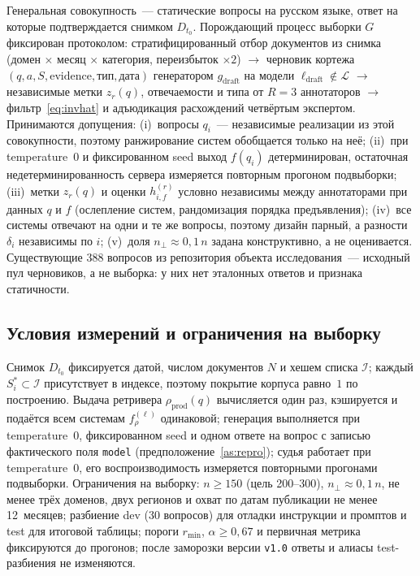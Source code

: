 \documentclass{article}
\newcommand{\Lm}{\mathcal{L}}
\newcommand{\rprod}{\rho_{\mathrm{prod}}}
\newcommand{\ldraft}{\ell_{\mathrm{draft}}}
\newcommand{\gdraft}{g_{\mathrm{draft}}}
\newcommand{\refuse}{\bot}                          %
\newcommand{\rmin}{r_{\min}}
\begin{document}
Генеральная совокупность~--- статические вопросы на русском языке, ответ на которые подтверждается снимком $D_{t_0}$. Порождающий процесс выборки $G$ фиксирован протоколом: стратифицированный отбор документов из снимка (домен $\times$ месяц $\times$ категория, переизбыток $\times2$) $\to$ черновик кортежа $(q,a,S,\text{evidence},\text{тип},\text{дата})$ генератором $\gdraft$ на модели $\ldraft\notin\Lm$ $\to$ независимые метки $z_r(q)$, отвечаемости и типа от $R=3$ аннотаторов $\to$ фильтр~\eqref{eq:invhat} и адъюдикация расхождений четвёртым экспертом. Принимаются допущения: (i)~вопросы $q_i$~--- независимые реализации из этой совокупности, поэтому ранжирование систем обобщается только на неё; (ii)~при temperature~$0$ и фиксированном seed выход $f(q_i)$ детерминирован, остаточная недетерминированность сервера измеряется повторным прогоном подвыборки; (iii)~метки $z_r(q)$ и оценки $h^{(r)}_{i,f}$ условно независимы между аннотаторами при данных $q$ и $f$ (ослепление систем, рандомизация порядка предъявления); (iv)~все системы отвечают на одни и те же вопросы, поэтому дизайн парный, а разности $\delta_i$ независимы по $i$; (v)~доля $n_{\refuse}\approx0{,}1\,n$ задана конструктивно, а не оценивается. Существующие 388 вопросов из репозитория объекта исследования~--- исходный пул черновиков, а не выборка: у них нет эталонных ответов и признака статичности.

\subsection{Условия измерений и ограничения на выборку}

Снимок $D_{t_0}$ фиксируется датой, числом документов $N$ и хешем списка $\mathcal{I}$; каждый $S^*_i\subset\mathcal{I}$ присутствует в индексе, поэтому покрытие корпуса равно~$1$ по построению. Выдача ретривера $\rprod(q)$ вычисляется один раз, кэшируется и подаётся всем системам $f_\rho^{(\ell)}$ одинаковой; генерация выполняется при temperature~$0$, фиксированном seed и одном ответе на вопрос с записью фактического поля \texttt{model} (предположение~\ref{as:repro}); судья работает при temperature~$0$, его воспроизводимость измеряется повторными прогонами подвыборки. Ограничения на выборку: $n\ge150$ (цель 200--300), $n_{\refuse}\approx0{,}1\,n$, не менее трёх доменов, двух регионов и охват по датам публикации не менее 12~месяцев; разбиение dev (30 вопросов) для отладки инструкции и промптов и test для итоговой таблицы; пороги $\rmin$, $\alpha\ge0{,}67$ и первичная метрика фиксируются до прогонов; после заморозки версии \texttt{v1.0} ответы и алиасы test-разбиения не изменяются.
\end{document}
